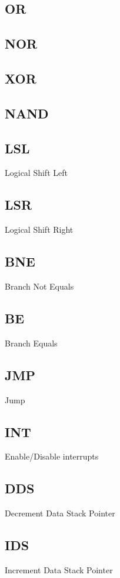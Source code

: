 \documentclass[a4paper]{article}
\begin{document}
\subsection{OR}

\subsection{NOR}

\subsection{XOR}

\subsection{NAND}

\subsection{LSL}

Logical Shift Left

\subsection{LSR}
Logical Shift Right

\subsection{BNE}
Branch Not Equals

\subsection{BE}
Branch Equals

\subsection{JMP}
Jump 

\subsection{INT}
Enable/Disable interrupts

\subsection{DDS}
Decrement Data Stack Pointer

\subsection{IDS}
Increment Data Stack Pointer
\end{document}
